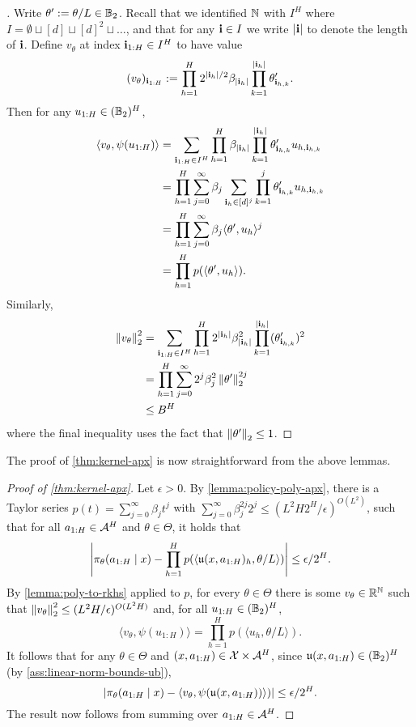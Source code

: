 \begin{proof}[]Write $\theta' := \theta/L \in \mathbb{B}_2$. Recall that we identified $\mathbb{N}$ with $I^H$ where $I = \emptyset\sqcup[d]\sqcup[d]^2 \sqcup\dots$, and that for any $\mathbf{i}\in I$ we write $|\mathbf{i}|$ to denote the length of $\mathbf{i}$. Define $v_\theta$ at index $\mathbf{i}_{1:H} \in I^H$ to have value 
\[(v_\theta)_{\mathbf{i}_{1:H}} := \prod_{h=1}^H 2^{|\mathbf{i}_h|/2} \beta_{|\mathbf{i}_h|} \prod_{k=1}^{|\mathbf{i}_h|} \theta'_{ \mathbf{i}_{h,k}}.\]
Then for any $u_{1:H} \in (\mathbb{B}_2)^H$,
\begin{align}
\langle v_\theta,\psi(u_{1:H})\rangle
&= \sum_{\mathbf{i}_{1:H}\in I^H} \prod_{h=1}^H \beta_{|\mathbf{i}_h|} \prod_{k=1}^{|\mathbf{i}_h|} \theta'_{\mathbf{i}_{h,k}} u_{h,\mathbf{i}_{h,k}} \\ 
&= \prod_{h=1}^H \sum_{j=0}^\infty \beta_j \sum_{\mathbf{i}_h \in [d]^j} \prod_{k=1}^j \theta'_{\mathbf{i}_{h,k}} u_{h,\mathbf{i}_{h,k}} \\ 
&= \prod_{h=1}^H \sum_{j=0}^\infty \beta_j \langle \theta',u_h\rangle^j \\ 
&= \prod_{h=1}^H p(\langle \theta',u_h\rangle).
\end{align}
Similarly,
\begin{align}
\left \lVert v_\theta \right \rVert_2^2
&= \sum_{\mathbf{i}_{1:H}\in I^H} \prod_{h=1}^H 2^{|\mathbf{i}_h|} \beta_{|\mathbf{i}_h|}^2 \prod_{k=1}^{|\mathbf{i}_h|} (\theta'_{\mathbf{i}_{h,k}})^2 \\ 
&= \prod_{h=1}^H \sum_{j=0}^\infty 2^j \beta_j^2 \left \lVert \theta' \right \rVert_2^{2j} \\ 
&\leq B^H
\end{align}
where the final inequality uses the fact that $\left \lVert \theta' \right \rVert_2 \leq 1$.
\end{proof}

The proof of \cref{thm:kernel-apx} is now straightforward from the above lemmas.

\begin{proof}[Proof of \cref{thm:kernel-apx}]
Let $\epsilon > 0$. By \cref{lemma:policy-poly-apx}, there is a Taylor series $p(t) = \sum_{j=0}^\infty \beta_j t^j$ with $\sum_{j=0}^\infty \beta_j^{2j} 2^j \leq (L^2 H2^H/\epsilon)^{O(L^2)}$, such that for all $a_{1:H} \in \mathcal{A}^H$ and $\theta \in \Theta$, it holds that
\[\left|\pi_\theta(a_{1:H}\mid{}x) - \prod_{h=1}^H p(\langle \mathfrak{u}(x,a_{1:H})_h,\theta/L\rangle)\right| \leq \epsilon/2^H.\]
By \cref{lemma:poly-to-rkhs} applied to $p$, for every $\theta\in\Theta$ there is some $v_\theta\in\mathbb{R}^{\mathbb{N}}$ such that $\left \lVert v_\theta \right \rVert_2^2 \leq (L^2 H/\epsilon)^{O(L^2 H)}$ and, for all $u_{1:H} \in (\mathbb{B}_2)^H$,
\[\langle v_\theta,\psi(u_{1:H})\rangle = \prod_{h=1}^H p(\langle u_h, \theta/L\rangle).\]
It follows that for any $\theta \in \Theta$ and $(x,a_{1:H}) \in \mathcal{X}\times\mathcal{A}^H$, since $\mathfrak{u}(x,a_{1:H}) \in (\mathbb{B}_2)^H$ (by \cref{ass:linear-norm-bounds-ub}),
\[\left|\pi_\theta(a_{1:H}\mid{}x) - \langle v_\theta, \psi(\mathfrak{u}(x,a_{1:H}))\rangle)\right| \leq \epsilon/2^H.\]
The result now follows from summing over $a_{1:H} \in \mathcal{A}^H$.
\end{proof}

